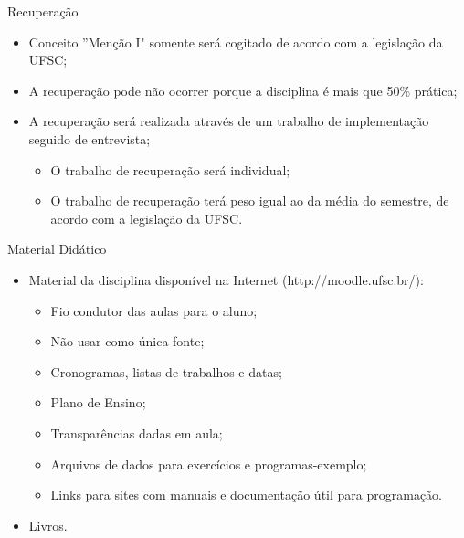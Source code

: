 \documentclass[12pt]{beamer}
\begin{document}
\begin{frame}{Recuperação}
\begin{itemize}
\item Conceito ''Menção I" somente será cogitado de acordo com a legislação da UFSC;
\item A recuperação pode não ocorrer porque a disciplina é mais que 50\% prática;
\item A recuperação será realizada através de um trabalho de implementação seguido de entrevista;
\begin{itemize}
\item O trabalho de recuperação será individual;
\item O trabalho de recuperação terá peso igual ao da média do semestre, de acordo com a legislação da UFSC.
\end{itemize}
\end{itemize}
\end{frame}

\begin{frame}{Material Didático}
\begin{itemize}
\item Material da disciplina disponível na Internet (http://moodle.ufsc.br/):
\begin{itemize}
\item Fio condutor das aulas para o aluno; 
\item Não usar como única fonte;
\item Cronogramas, listas de trabalhos e datas; 
\item Plano de Ensino;
\item Transparências dadas em aula;
\item Arquivos de dados para exercícios e programas-exemplo;
\item Links para sites com manuais e documentação útil para programação.
\end{itemize}
\item Livros.
\end{itemize}
\end{frame}
\end{document}
